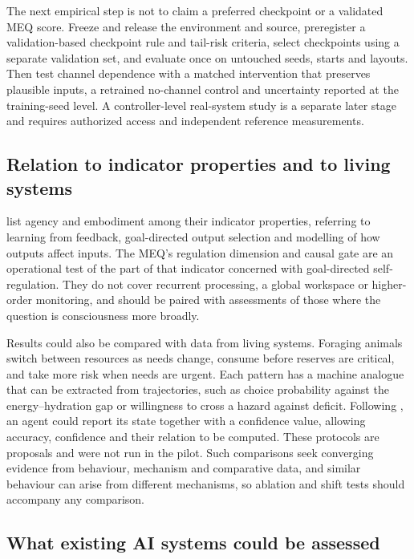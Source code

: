 \documentclass[twoside,11pt]{article}
\begin{document}
The next empirical step is not to claim a preferred checkpoint or a validated MEQ score. Freeze and release the environment and source, preregister a validation-based checkpoint rule and tail-risk criteria, select checkpoints using a separate validation set, and evaluate once on untouched seeds, starts and layouts. Then test channel dependence with a matched intervention that preserves plausible inputs, a retrained no-channel control and uncertainty reported at the training-seed level. A controller-level real-system study is a separate later stage and requires authorized access and independent reference measurements.

\subsection{Relation to indicator properties and to living systems}\label{sec:7.2}

\citet{butlin2023} list agency and embodiment among their indicator properties, referring to learning from feedback, goal-directed output selection and modelling of how outputs affect inputs. The MEQ's regulation dimension and causal gate are an operational test of the part of that indicator concerned with goal-directed self-regulation. They do not cover recurrent processing, a global workspace or higher-order monitoring, and should be paired with assessments of those where the question is consciousness more broadly.

Results could also be compared with data from living systems. Foraging animals switch between resources as needs change, consume before reserves are critical, and take more risk when needs are urgent. Each pattern has a machine analogue that can be extracted from trajectories, such as choice probability against the energy--hydration gap or willingness to cross a hazard against deficit. Following \citet{garfinkel2015}, an agent could report its state together with a confidence value, allowing accuracy, confidence and their relation to be computed. These protocols are proposals and were not run in the pilot. Such comparisons seek converging evidence from behaviour, mechanism and comparative data, and similar behaviour can arise from different mechanisms, so ablation and shift tests should accompany any comparison.

\subsection{What existing AI systems could be assessed}\label{sec:7.3}
\end{document}
